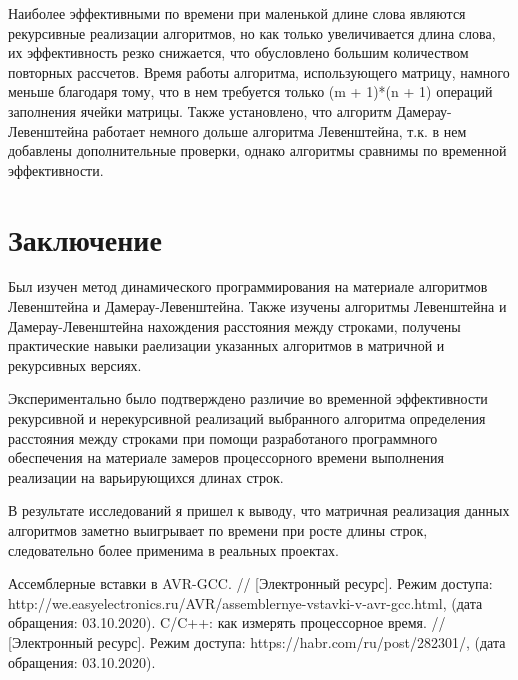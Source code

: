 \documentclass[utf8x, 12pt]{G7-32}
\begin{document}
\par
Наиболее эффективными по времени при маленькой длине слова являются рекурсивные реализации алгоритмов, но как только увеличивается длина слова, их эффективность резко снижается, что обусловлено большим количеством повторных рассчетов. Время работы алгоритма, использующего матрицу, намного меньше благодаря тому, что в нем требуется только (m + 1)*(n + 1) операций заполнения ячейки матрицы. Также установлено, что алгоритм Дамерау-Левенштейна работает немного дольше алгоритма Левенштейна, т.к. в нем добавлены дополнительные проверки, однако алгоритмы сравнимы по временной эффективности.


\chapter*{Заключение}
Был изучен метод динамического программирования на материале алгоритмов Левенштейна и Дамерау-Левенштейна.
Также изучены алгоритмы Левенштейна и Дамерау-Левенштейна нахождения расстояния между строками, получены практические навыки раелизации указанных алгоритмов в матричной  и рекурсивных версиях. 

Экспериментально было подтверждено различие во временной эффективности рекурсивной и нерекурсивной реализаций выбранного алгоритма определения расстояния между строками при помощи разработаного программного обеспечения на материале замеров процессорного времени выполнения реализации на варьирующихся длинах строк. 

В результате исследований я пришел к выводу, что матричная реализация данных алгоритмов заметно выигрывает по времени при росте длины строк, следовательно более применима в реальных проектах.
 
\begin{thebibliography}{}
      Ассемблерные вставки в AVR-GCC. // [Электронный ресурс]. Режим доступа: http://we.easyelectronics.ru/AVR/assemblernye-vstavki-v-avr-gcc.html, (дата обращения: 03.10.2020).
      C/C++: как измерять процессорное время. // [Электронный ресурс]. Режим доступа: https://habr.com/ru/post/282301/, (дата обращения: 03.10.2020).
\end{thebibliography}
\end{document}

